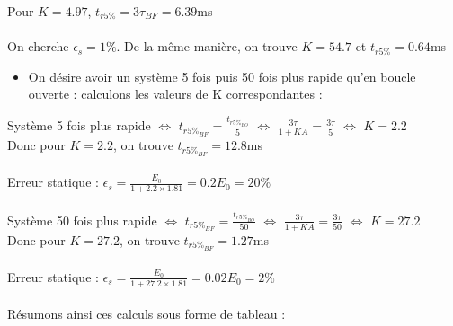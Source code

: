 \documentclass[12pt]{article}
\begin{document}
Pour $K = 4.97$, $t_{r5\%} = 3\tau_{BF} = 6.39$ms
\\\\On cherche $\epsilon_s = 1\%$. De la même manière, on trouve $K = 54.7$ et $t_{r5\%} = 0.64$ms

\begin{itemize}
    \item On désire avoir un système 5 fois puis 50 fois plus rapide qu'en boucle ouverte : calculons les valeurs de K correspondantes : 
\end{itemize}

Système 5 fois plus rapide $\Leftrightarrow$ \large$ t_{r5\%_{BF}} = \frac{t_{r5\%_{BO}}}{5}$ \normalsize $\Leftrightarrow$ \large $\frac{3\tau}{1 + KA} = \frac{3\tau}{5}$ \normalsize $\Leftrightarrow$ \large $K = 2.2$
\\\normalsize Donc pour $K = 2.2$, on trouve $t_{r5\%_{BF}} = 12.8$ms
\\\\\normalsize Erreur statique : \large $\epsilon_s = \frac{E_0}{1 + 2.2\times 1.81} = 0.2E_0 = 20\%$
\\\\\normalsize Système 50 fois plus rapide $\Leftrightarrow$ \large$ t_{r5\%_{BF}} = \frac{t_{r5\%_{BO}}}{50}$ \normalsize $\Leftrightarrow$ \large $\frac{3\tau}{1 + KA} = \frac{3\tau}{50}$ \normalsize $\Leftrightarrow$ \large $K = 27.2$
\\\normalsize Donc pour $K = 27.2$, on trouve $t_{r5\%_{BF}} = 1.27$ms
\\\\\normalsize Erreur statique : \large $\epsilon_s = \frac{E_0}{1 + 27.2\times 1.81} = 0.02E_0 = 2\%$
\\\\
\normalsize Résumons ainsi ces calculs sous forme de tableau : 
\end{document}
